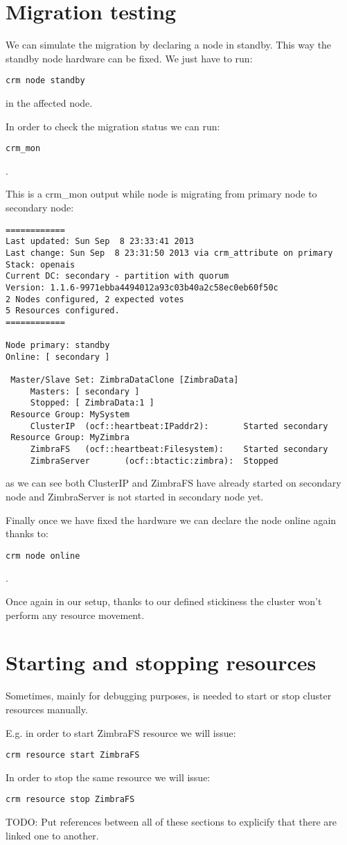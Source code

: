 \section {Migration testing}
We can simulate the migration by declaring a node in standby. This way the standby node hardware can be fixed. We just have to run:
\begin{verbatim}
crm node standby
\end{verbatim}
in the affected node.

In order to check the migration status we can run:
\begin{verbatim}
crm_mon
\end{verbatim}
.

This is a crm\_mon output while node is migrating from primary node to secondary node:
\begin{verbatim}
============
Last updated: Sun Sep  8 23:33:41 2013
Last change: Sun Sep  8 23:31:50 2013 via crm_attribute on primary
Stack: openais
Current DC: secondary - partition with quorum
Version: 1.1.6-9971ebba4494012a93c03b40a2c58ec0eb60f50c
2 Nodes configured, 2 expected votes
5 Resources configured.
============

Node primary: standby
Online: [ secondary ]

 Master/Slave Set: ZimbraDataClone [ZimbraData]
     Masters: [ secondary ]
     Stopped: [ ZimbraData:1 ]
 Resource Group: MySystem
     ClusterIP  (ocf::heartbeat:IPaddr2):       Started secondary
 Resource Group: MyZimbra
     ZimbraFS   (ocf::heartbeat:Filesystem):    Started secondary
     ZimbraServer       (ocf::btactic:zimbra):  Stopped

\end{verbatim}
as we can see both ClusterIP and ZimbraFS have already started on secondary node and ZimbraServer is not started in secondary node yet.


Finally once we have fixed the hardware we can declare the node online again thanks to:
\begin{verbatim}
crm node online
\end{verbatim}
.

Once again in our setup, thanks to our defined stickiness the cluster won't perform any resource movement.

\section {Starting and stopping resources}
Sometimes, mainly for debugging purposes, is needed to start or stop cluster resources manually.

E.g. in order to start ZimbraFS resource we will issue:
\begin{verbatim}
crm resource start ZimbraFS
\end{verbatim}
In order to stop the same resource we will issue:
\begin{verbatim}
crm resource stop ZimbraFS
\end{verbatim}

TODO: Put references between all of these sections to explicify that there are linked one to another.

